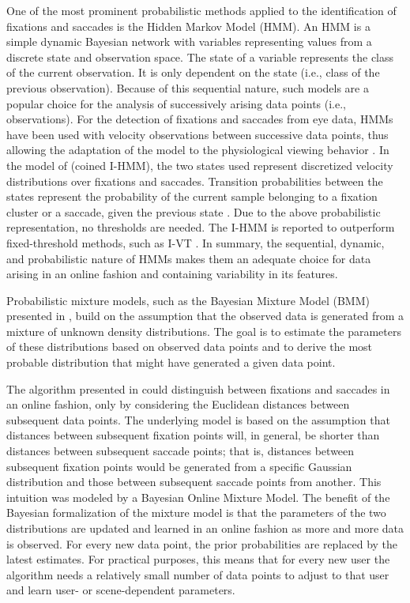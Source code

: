 \documentclass[preprint,12pt]{elsarticle}
\begin{document}
One of the most prominent probabilistic methods applied to the identification of fixations and saccades is the Hidden Markov Model (HMM).
An HMM is a simple dynamic Bayesian network with variables representing values from a discrete state and observation space.
The state of a variable represents the class of the current observation. It is only dependent on the state (i.e., class of the previous observation).
Because of this sequential nature, such models are a popular choice for the analysis of successively arising data points (i.e., observations).
For the detection of fixations and saccades from eye data, HMMs have been used with velocity observations between successive data points,
thus allowing the adaptation of the model to the physiological viewing behavior \cite{Salvucci:2000:IFS:355017.355028}.
In the model of \cite{Salvucci:2000:IFS:355017.355028} (coined I-HMM),
the two states used represent discretized velocity distributions over fixations and saccades.
Transition probabilities between the states represent the probability of the current sample belonging to a fixation cluster or a saccade,
given the previous state \cite{holmqvist-eye-tracking-a-comprehensive-guide-to-methods-and-measures}.
Due to the above probabilistic representation, no thresholds are needed.
The I-HMM is reported to outperform fixed-threshold methods,
such as I-VT \cite{Salvucci:2000:IFS:355017.355028}.
In summary, the sequential, dynamic,
and probabilistic nature of HMMs makes them an adequate choice for data arising in an online fashion and containing variability in its features.

Probabilistic mixture models, such as the Bayesian Mixture Model (BMM) presented in \cite{Tafaj:2012:BOC:2168556.2168617},
build on the assumption that the observed data is generated from a mixture of unknown density distributions.
The goal is to estimate the parameters of these distributions based on observed data points and to derive the most probable distribution that might have generated a given data point.

The algorithm presented in \cite{Tafaj:2012:BOC:2168556.2168617} could distinguish between fixations and saccades in an online fashion,
only by considering the Euclidean distances between subsequent data points.
The underlying model is based on the assumption
that distances between subsequent fixation points will, in general, be shorter than distances between subsequent saccade points;
that is, distances between subsequent fixation points would be generated from a specific Gaussian distribution and those between subsequent saccade points from another.
This intuition was modeled by a Bayesian Online Mixture Model.
The benefit of the Bayesian formalization of the mixture model
is that the parameters of the two distributions are updated and learned in an online fashion as more and more data is observed.
For every new data point, the prior probabilities are replaced by the latest estimates.
For practical purposes, this means that for every new user the algorithm needs a relatively small number of data points to
adjust to that user and learn user- or scene-dependent parameters.
\end{document}

